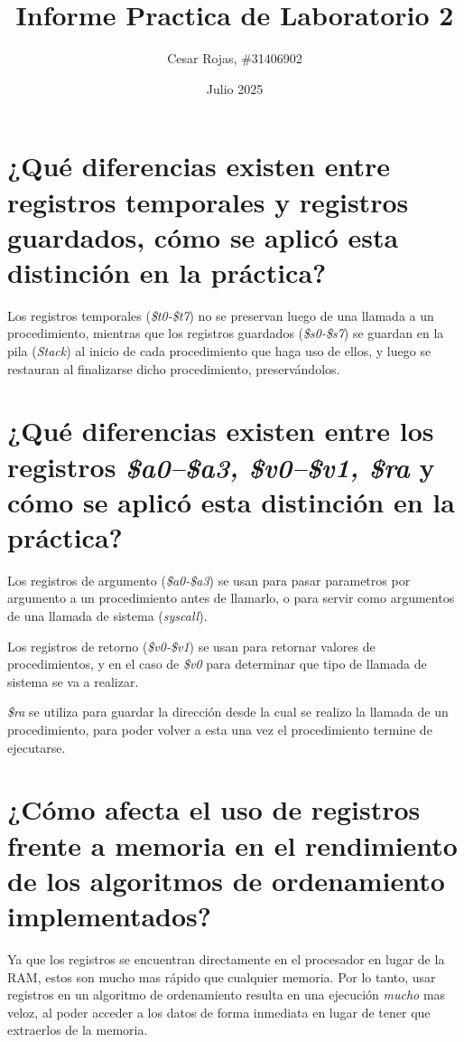 \documentclass[titlepage]{article}
\title{Informe Practica de Laboratorio 2}
\author{Cesar Rojas, \#31406902}
\date{Julio 2025}
\begin{document}
\maketitle

\section*{¿Qué diferencias existen entre registros temporales y registros guardados, cómo se aplicó esta distinción en la práctica?}

Los registros temporales (\emph{\$t0-\$t7}) no se preservan luego de una llamada a un procedimiento, mientras que los registros guardados (\emph{\$s0-\$s7}) se guardan en la pila (\emph{Stack}) al inicio de cada procedimiento que haga uso de ellos, y luego se restauran al finalizarse dicho procedimiento, preservándolos.

\section*{¿Qué diferencias existen entre los registros \emph{\$a0–\$a3, \$v0–\$v1, \$ra} y cómo se aplicó esta
distinción en la práctica?}

Los registros de argumento (\emph{\$a0-\$a3}) se usan para pasar parametros por argumento a un procedimiento antes de llamarlo, o para servir como argumentos de una llamada de sistema (\emph{syscall}).

Los registros de retorno (\emph{\$v0-\$v1}) se usan para retornar valores de procedimientos, y en el caso de \emph{\$v0} para determinar que tipo de llamada de sistema se va a realizar.

\emph{\$ra} se utiliza para guardar la dirección desde la cual se realizo la llamada de un procedimiento, para poder volver a esta una vez el procedimiento termine de ejecutarse.

\section*{¿Cómo afecta el uso de registros frente a memoria en el rendimiento de los algoritmos de ordenamiento implementados?}

Ya que los registros se encuentran directamente en el procesador en lugar de la RAM, estos son mucho mas rápido que cualquier memoria. Por lo tanto, usar registros en un algoritmo de ordenamiento resulta en una ejecución \emph{mucho} mas veloz, al poder acceder a los datos de forma inmediata en lugar de tener que extraerlos de la memoria.
\end{document}
